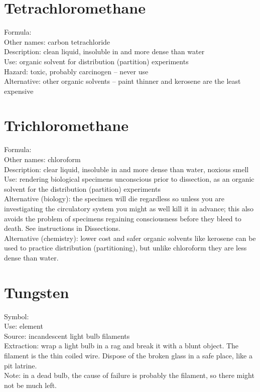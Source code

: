 \section{Tetrachloromethane}
\label{sec:tetrachloromethane}
Formula: \\
Other names: carbon tetrachloride\\
Description: clean liquid, 
insoluble in and more dense than water\\
Use: organic solvent for distribution (partition) experiments\\
Hazard: toxic, 
probably carcinogen -- never use\\
Alternative: other organic solvents -- 
paint thinner and kerosene are the least expensive

\section{Trichloromethane}
\label{sec:trichloromethane}
Formula: \\
Other names: chloroform\\
Description: clear liquid, 
insoluble in and more dense than water, 
noxious smell\\
Use: rendering biological specimens unconscious prior to dissection, 
as an organic solvent for the distribution (partition) experiments\\
Alternative (biology): the specimen will die regardless 
so unless you are investigating the circulatory system 
you might as well kill it in advance; 
this also avoids the problem of specimens regaining consciousness 
before they bleed to death. 
See instructions in Dissections.\\
Alternative (chemistry): lower cost and safer organic solvents like kerosene can be used to practice distribution (partitioning), 
but unlike chloroform they are less dense than water.

\section{Tungsten}
\label{sec:}
Symbol: \\
Use: element\\
Source: incandescent light bulb filaments\\
Extraction: wrap a light bulb in a rag and break it with a blunt object. 
The filament is the thin coiled wire. 
Dispose of the broken glass in a safe place, 
like a pit latrine.\\
Note: in a dead bulb, the cause of failure is probably the filament, 
so there might not be much left.

